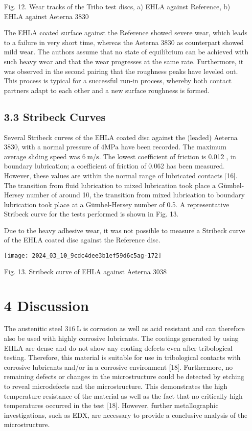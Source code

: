 \documentclass[10pt]{article}
\begin{document}
Fig. 12. Wear tracks of the Tribo test discs, a) EHLA against Reference, b) EHLA against Aeterna 3830

The EHLA coated surface against the Reference showed severe wear, which leads to a failure in very short time, whereas the Aeterna 3830 as counterpart showed mild wear. The authors assume that no state of equilibrium can be achieved with such heavy wear and that the wear progresses at the same rate. Furthermore, it was observed in the second pairing that the roughness peaks have leveled out. This process is typical for a successful run-in process, whereby both contact partners adapt to each other and a new surface roughness is formed.

\subsection*{3.3 Stribeck Curves}
Several Stribeck curves of the EHLA coated disc against the (leaded) Aeterna 3830, with a normal pressure of $4 \mathrm{MPa}$ have been recorded. The maximum average sliding speed was $6 \mathrm{~m} / \mathrm{s}$. The lowest coefficient of friction is 0.012 , in boundary lubrication; a coefficient of friction of 0.062 has been measured. However, these values are within the normal range of lubricated contacts [16]. The transition from fluid lubrication to mixed lubrication took place a Gümbel-Hersey number of around 10, the transition from mixed lubrication to boundary lubrication took place at a Gümbel-Hersey number of 0.5. A representative Stribeck curve for the tests performed is shown in Fig. 13.

Due to the heavy adhesive wear, it was not possible to measure a Stribeck curve of the EHLA coated disc against the Reference disc.

\begin{center}
\texttt{[image: 2024\_03\_10\_9cdc4dee3b1ef59d6c5ag-172]}
\end{center}

Fig. 13. Stribeck curve of EHLA against Aeterna 3038

\section*{4 Discussion}
The austenitic steel $316 \mathrm{~L}$ is corrosion as well as acid resistant and can therefore also be used with highly corrosive lubricants. The coatings generated by using EHLA are dense and do not show any coating defects even after tribological testing. Therefore, this material is suitable for use in tribological contacts with corrosive lubricants and/or in a corrosive environment [18]. Furthermore, no remaining defects or changes in the microstructure could be detected by etching to reveal microdefects and the microstructure. This demonstrates the high temperature resistance of the material as well as the fact that no critically high temperatures occurred in the test [18]. However, further metallographic investigations, such as EDX, are necessary to provide a conclusive analysis of the microstructure.
\end{document}
